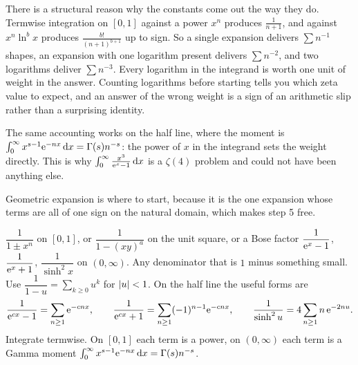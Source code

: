 There is a structural reason why the constants come out the way they do. Termwise integration on $[0,1]$ against a power $x^{n}$ produces $\frac{1}{n+1}$, and against $x^{n}\ln^{b}x$ produces $\frac{b!}{(n+1)^{b+1}}$ up to sign. So a single expansion delivers $\sum n^{-1}$ shapes, an expansion with one logarithm present delivers $\sum n^{-2}$, and two logarithms deliver $\sum n^{-3}$. Every logarithm in the integrand is worth one unit of weight in the answer. Counting logarithms before starting tells you which zeta value to expect, and an answer of the wrong weight is a sign of an arithmetic slip rather than a surprising identity.

The same accounting works on the half line, where the moment is $\int_0^\infty x^{s-1}\mathrm{e}^{-nx}\,\mathrm{d} x=\Gamma(s)n^{-s}$: the power of $x$ in the integrand sets the weight directly. This is why $\int_0^\infty\frac{x^{3}}{\mathrm{e}^{x}-1}\,\mathrm{d} x$ is a $\zeta(4)$ problem and could not have been anything else.

Geometric expansion is where to start, because it is the one expansion whose terms are all of one sign on the natural domain, which makes step 5 free.

\cue $\dfrac{1}{1\pm x^{n}}$ on $[0,1]$, or $\dfrac{1}{1-(xy)^{a}}$ on the unit square, or a Bose factor $\dfrac{1}{\mathrm{e}^{x}-1}$, $\dfrac{1}{\mathrm{e}^{x}+1}$, $\dfrac{1}{\sinh^{2}x}$ on $(0,\infty)$. Any denominator that is $1$ minus something small.
\method Use $\dfrac{1}{1-u}=\sum_{k\geq0}u^{k}$ for $\left\lvert u\right\rvert<1$. On the half line the useful forms are
\[\frac{1}{\mathrm{e}^{cx}-1}=\sum_{n\geq1}\mathrm{e}^{-cnx},\qquad \frac{1}{\mathrm{e}^{cx}+1}=\sum_{n\geq1}(-1)^{n-1}\mathrm{e}^{-cnx},\qquad \frac{1}{\sinh^{2}u}=4\sum_{n\geq1}n\,\mathrm{e}^{-2nu}.\]
Integrate termwise. On $[0,1]$ each term is a power, on $(0,\infty)$ each term is a Gamma moment $\int_0^\infty x^{s-1}\mathrm{e}^{-nx}\,\mathrm{d} x=\Gamma(s)n^{-s}$.

